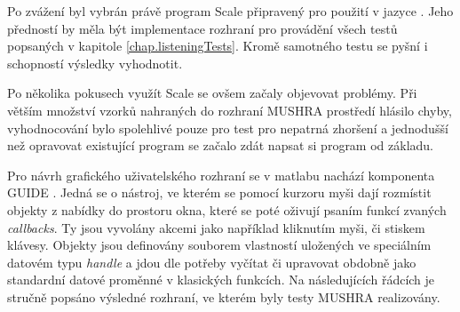 Po zvážení byl vybrán právě program Scale \cite{article:scale} připravený pro použití v jazyce \matlab. Jeho předností by měla být implementace rozhraní pro provádění všech testů popsaných v kapitole \ref{chap.listeningTests}. Kromě samotného testu se pyšní i schopností výsledky vyhodnotit.

Po několika pokusech využít Scale se ovšem začaly objevovat problémy. Při větším množství vzorků nahraných do rozhraní MUSHRA prostředí \matlab hlásilo chyby, vyhodnocování bylo spolehlivé pouze pro test pro nepatrná zhoršení \cite{itur:1116} a jednodušší než opravovat existující program se začalo zdát napsat si program od základu.


Pro návrh grafického uživatelského rozhraní se v matlabu nachází komponenta GUIDE \cite{web:guide}. Jedná se o nástroj, ve kterém se pomocí kurzoru myši dají rozmístit objekty z nabídky do prostoru okna, které se poté oživují psaním funkcí zvaných \textit{callbacks}. Ty jsou vyvolány akcemi jako například kliknutím myši, či stiskem klávesy. Objekty jsou definovány souborem vlastností uložených ve speciálním datovém typu \textit{handle} a jdou dle potřeby vyčítat či upravovat obdobně jako standardní datové proměnné v klasických funkcích. Na následujících řádcích je stručně popsáno výsledné rozhraní, ve kterém byly testy MUSHRA realizovány.

